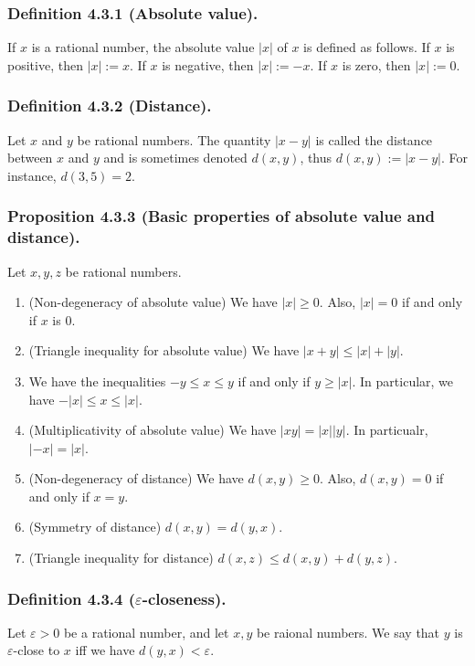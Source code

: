 \documentclass[12pt, letter]{article}
\begin{document}
\subsubsection*{Definition 4.3.1 (Absolute value).}
If $x$ is a rational number, the absolute value $|x|$ of $x$ is defined as follows. If $x$ is positive, then $|x|:=x$. If $x$ is negative, then $|x|:=-x$.
If $x$ is zero, then $|x|:=0$.
\subsubsection*{Definition 4.3.2 (Distance).}
Let $x$ and $y$ be rational numbers. The quantity $|x-y|$ is called the distance between $x$ and $y$ and is sometimes denoted $d(x,y)$, thus $d(x,y):=|x-y|$.
For instance, $d(3,5)=2$.
\subsubsection*{Proposition 4.3.3 (Basic properties of absolute value and distance).}
Let $x,y,z$ be rational numbers.
\begin{enumerate}[label=(\alph*)]
    \item (Non-degeneracy of absolute value) We have $|x|\geq 0$. Also, $|x|=0$ if and only if $x$ is 0.
    \item (Triangle inequality for absolute value) We have $|x+y|\leq |x|+|y|$.
    \item We have the inequalities $-y\leq x\leq y$ if and only if $y\geq |x|$. In particular, we have $-|x|\leq x\leq |x|$.
    \item (Multiplicativity of absolute value) We have $|xy|=|x||y|$. In particualr, $|-x|=|x|$.
    \item (Non-degeneracy of distance) We have $d(x,y)\geq 0$. Also, $d(x,y)=0$ if and only if $x=y$.
    \item (Symmetry of distance) $d(x,y)=d(y,x)$.
    \item (Triangle inequality for distance) $d(x,z)\leq d(x,y)+d(y,z)$.
\end{enumerate}
\subsubsection*{Definition 4.3.4 ($\varepsilon$-closeness).}
Let $\varepsilon >0$ be a rational number, and let $x,y$ be raional numbers. We say that $y$ is $\varepsilon$-close to $x$ iff we have $d(y,x)<\varepsilon$.
\end{document}
